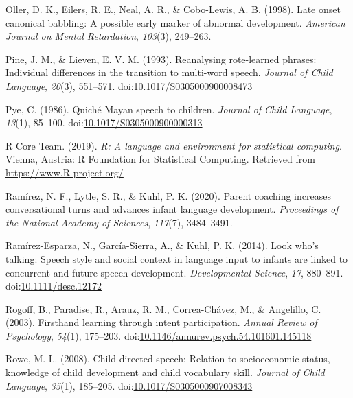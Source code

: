\documentclass[,man,floatsintext]{apa6}
\begin{document}
\hypertarget{ref-oller1998late}{}
Oller, D. K., Eilers, R. E., Neal, A. R., \& Cobo-Lewis, A. B. (1998).
Late onset canonical babbling: A possible early marker of abnormal
development. \emph{American Journal on Mental Retardation},
\emph{103}(3), 249--263.

\hypertarget{ref-pine1993reanalysing}{}
Pine, J. M., \& Lieven, E. V. M. (1993). Reanalysing rote-learned
phrases: Individual differences in the transition to multi-word speech.
\emph{Journal of Child Language}, \emph{20}(3), 551--571.
doi:\href{https://doi.org/10.1017/S0305000900008473}{10.1017/S0305000900008473}

\hypertarget{ref-pye1986quiche}{}
Pye, C. (1986). Quiché Mayan speech to children. \emph{Journal of Child
Language}, \emph{13}(1), 85--100.
doi:\href{https://doi.org/10.1017/S0305000900000313}{10.1017/S0305000900000313}

\hypertarget{ref-R-base}{}
R Core Team. (2019). \emph{R: A language and environment for statistical
computing}. Vienna, Austria: R Foundation for Statistical Computing.
Retrieved from \url{https://www.R-project.org/}

\hypertarget{ref-ramirez2020parent}{}
Ramírez, N. F., Lytle, S. R., \& Kuhl, P. K. (2020). Parent coaching
increases conversational turns and advances infant language development.
\emph{Proceedings of the National Academy of Sciences}, \emph{117}(7),
3484--3491.

\hypertarget{ref-ramirezesparza2014look}{}
Ramírez-Esparza, N., García-Sierra, A., \& Kuhl, P. K. (2014). Look
who's talking: Speech style and social context in language input to
infants are linked to concurrent and future speech development.
\emph{Developmental Science}, \emph{17}, 880--891.
doi:\href{https://doi.org/10.1111/desc.12172}{10.1111/desc.12172}

\hypertarget{ref-rogoff2003firsthand}{}
Rogoff, B., Paradise, R., Arauz, R. M., Correa-Chávez, M., \& Angelillo,
C. (2003). Firsthand learning through intent participation. \emph{Annual
Review of Psychology}, \emph{54}(1), 175--203.
doi:\href{https://doi.org/10.1146/annurev.psych.54.101601.145118}{10.1146/annurev.psych.54.101601.145118}

\hypertarget{ref-rowe2008child}{}
Rowe, M. L. (2008). Child-directed speech: Relation to socioeconomic
status, knowledge of child development and child vocabulary skill.
\emph{Journal of Child Language}, \emph{35}(1), 185--205.
doi:\href{https://doi.org/10.1017/S0305000907008343}{10.1017/S0305000907008343}
\end{document}

